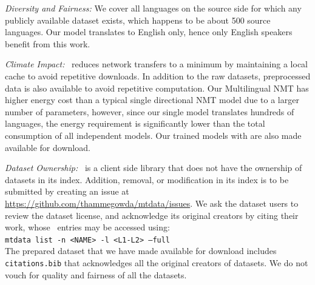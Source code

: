 \textit{Diversity and Fairness:}
We cover all languages on the source side for which any publicly available dataset exists, which happens to be about 500 source languages. 
Our model translates to English only, hence only English speakers benefit from this work. 


\textit{Climate Impact:}
\mtdata\ reduces network transfers to a minimum by maintaining a local cache to avoid repetitive downloads.
In addition to the raw datasets, preprocessed data is also available to avoid repetitive computation.
Our Multilingual NMT has higher energy cost than a typical single directional NMT model due to a larger number of parameters, however, since our single model translates hundreds of languages, the energy requirement is significantly lower than the total consumption of all independent models. 
Our trained models with are also made available for download.


\textit{Dataset Ownership:}
\mtdata\ is a client side library that does not have the ownership of datasets in its index.
Addition, removal, or modification in its index is to be submitted by creating an issue at \url{https://github.com/thammegowda/mtdata/issues}. 
We ask the dataset users to review the dataset license, and acknowledge its original creators by citing their work, whose \BibTeX\ entries may be accessed using:\\ \texttt{\footnotesize mtdata list -n <NAME> -l <L1-L2> --full} \\
The prepared dataset that we have made available for download includes \texttt{citations.bib} that acknowledges all the original creators of datasets.
We do not vouch for quality and fairness of all the datasets.
